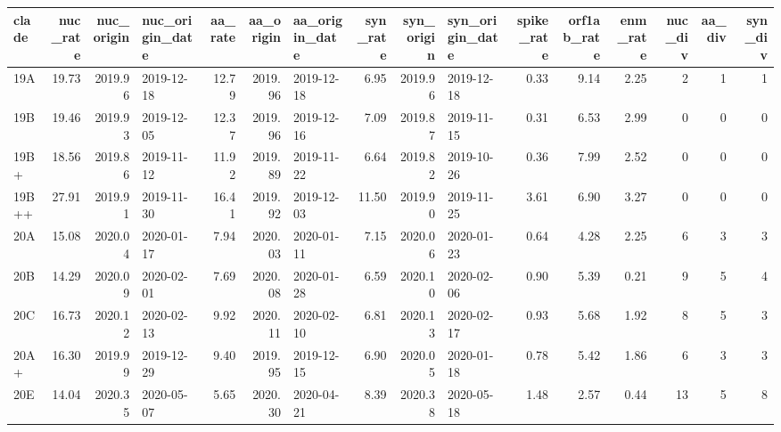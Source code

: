 \begin{tabular}{lrrlrrlrrlrrrrrr}
\toprule
clade &  nuc\_rate &  nuc\_origin & nuc\_origin\_date &  aa\_rate &  aa\_origin & aa\_origin\_date &  syn\_rate &  syn\_origin & syn\_origin\_date &  spike\_rate &  orf1ab\_rate &  enm\_rate &  nuc\_div &  aa\_div &  syn\_div \\
\midrule
  19A &     19.73 &     2019.96 &      2019-12-18 &    12.79 &    2019.96 &     2019-12-18 &      6.95 &     2019.96 &      2019-12-18 &        0.33 &         9.14 &      2.25 &        2 &       1 &        1 \\
  19B &     19.46 &     2019.93 &      2019-12-05 &    12.37 &    2019.96 &     2019-12-16 &      7.09 &     2019.87 &      2019-11-15 &        0.31 &         6.53 &      2.99 &        0 &       0 &        0 \\
 19B+ &     18.56 &     2019.86 &      2019-11-12 &    11.92 &    2019.89 &     2019-11-22 &      6.64 &     2019.82 &      2019-10-26 &        0.36 &         7.99 &      2.52 &        0 &       0 &        0 \\
19B++ &     27.91 &     2019.91 &      2019-11-30 &    16.41 &    2019.92 &     2019-12-03 &     11.50 &     2019.90 &      2019-11-25 &        3.61 &         6.90 &      3.27 &        0 &       0 &        0 \\
  20A &     15.08 &     2020.04 &      2020-01-17 &     7.94 &    2020.03 &     2020-01-11 &      7.15 &     2020.06 &      2020-01-23 &        0.64 &         4.28 &      2.25 &        6 &       3 &        3 \\
  20B &     14.29 &     2020.09 &      2020-02-01 &     7.69 &    2020.08 &     2020-01-28 &      6.59 &     2020.10 &      2020-02-06 &        0.90 &         5.39 &      0.21 &        9 &       5 &        4 \\
  20C &     16.73 &     2020.12 &      2020-02-13 &     9.92 &    2020.11 &     2020-02-10 &      6.81 &     2020.13 &      2020-02-17 &        0.93 &         5.68 &      1.92 &        8 &       5 &        3 \\
 20A+ &     16.30 &     2019.99 &      2019-12-29 &     9.40 &    2019.95 &     2019-12-15 &      6.90 &     2020.05 &      2020-01-18 &        0.78 &         5.42 &      1.86 &        6 &       3 &        3 \\
  20E &     14.04 &     2020.35 &      2020-05-07 &     5.65 &    2020.30 &     2020-04-21 &      8.39 &     2020.38 &      2020-05-18 &        1.48 &         2.57 &      0.44 &       13 &       5 &        8 \\

\end{tabular}
